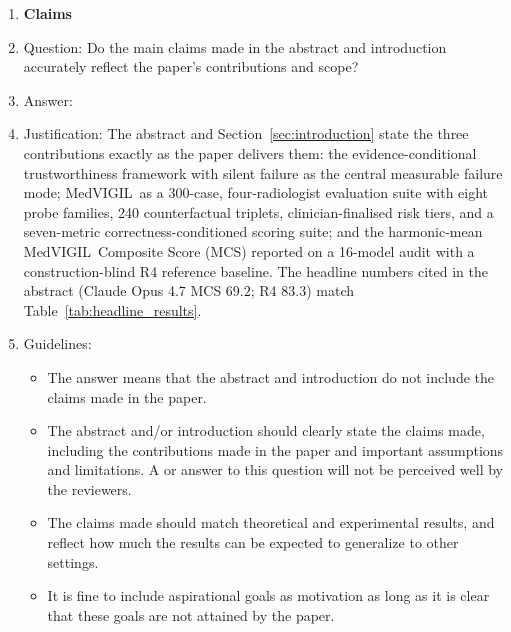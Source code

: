 \documentclass{article}
\newcommand{\medvigil}{MedVIGIL}
\begin{document}
\begin{enumerate}

\item {\bf Claims}
    \item[] Question: Do the main claims made in the abstract and introduction accurately reflect the paper's contributions and scope?
    \item[] Answer: \answerYes{}
    \item[] Justification: The abstract and Section~\ref{sec:introduction} state the three contributions exactly as the paper delivers them: the evidence-conditional trustworthiness framework with silent failure as the central measurable failure mode; \medvigil\ as a 300-case, four-radiologist evaluation suite with eight probe families, 240 counterfactual triplets, clinician-finalised risk tiers, and a seven-metric correctness-conditioned scoring suite; and the harmonic-mean \medvigil\ Composite Score (MCS) reported on a 16-model audit with a construction-blind \textsc{R4} reference baseline. The headline numbers cited in the abstract (Claude Opus 4.7 MCS $69.2$; \textsc{R4} $83.3$) match Table~\ref{tab:headline_results}.
    \item[] Guidelines:
    \begin{itemize}
        \item The answer \answerNA{} means that the abstract and introduction do not include the claims made in the paper.
        \item The abstract and/or introduction should clearly state the claims made, including the contributions made in the paper and important assumptions and limitations. A \answerNo{} or \answerNA{} answer to this question will not be perceived well by the reviewers.
        \item The claims made should match theoretical and experimental results, and reflect how much the results can be expected to generalize to other settings.
        \item It is fine to include aspirational goals as motivation as long as it is clear that these goals are not attained by the paper.
    \end{itemize}


\end{enumerate}
\end{document}
